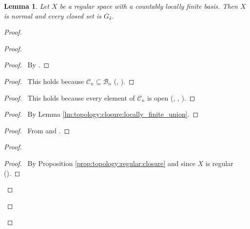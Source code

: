 \documentclass{report}
\newtheorem{lm}{Lemma}[section]
\theoremstyle{definition}
\begin{document}
\begin{lm}
  Let $X$ be a regular space with a countably locally finite basis. Then $X$ is normal and every closed set is $G_\delta$.
\end{lm}

\begin{proof}
  \pf
  \begin{proof}
    \begin{proof}
      \pf\ By .
    \end{proof}
    \begin{proof}
      \pf\ This holds because $\mathcal{C}_n \subseteq \mathcal{B}_n$ (, ).
    \end{proof}
    \begin{proof}
      \pf\ This holds because every element of $\mathcal{C}_n$ is open (, , ).
    \end{proof}
    \begin{proof}
      \pf\ By Lemma \ref{lm:topology:closure:locally_finite_union}.
    \end{proof}
    \begin{proof}
      \pf\ From  and .
    \end{proof}
    \begin{proof}
      \begin{proof}
        \pf\ By Proposition \ref{prop:topology:regular:closure} and  since $X$ is regular ().

\end{proof}
\end{proof}
\end{proof}
\end{proof}
\end{document}
